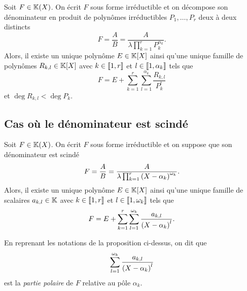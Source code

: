 \documentclass{magnolia}
\begin{document}
\begin{proposition}[nom={Décomposition en éléments simples}]
Soit $F\in\fracK$. On écrit $F$ sous forme irréductible et on
décompose son dénominateur en produit de polynômes irréductibles $P_1,\ldots,P_r$ deux
à deux distincts
\[F=\frac{A}{B}=\frac{A}{\lambda \prod_{k=1}^r P_k^{\alpha_k}}.\]
Alors, il existe un unique polynôme $E\in\polyK$ ainsi qu'une unique famille
de polynômes $R_{k,l}\in\polyK$ avec $k\in\left\llbracket 1,r\right\rrbracket$ et
$l\in\left\llbracket 1,\alpha_k\right\rrbracket$ tels que
\[F=E+\sum_{k=1}^r \sum_{l=1}^{\alpha_k} \frac{R_{k,l}}{P_k^l}\]
et $\deg R_{k,l}<\deg P_k$.
\end{proposition}

\subsection{Cas où le dénominateur est scindé}

\begin{proposition}
Soit $F\in\fracK$.  On écrit $F$ sous forme irréductible et on suppose
que son dénominateur est scindé
\[F=\frac{A}{B}=\frac{A}{\lambda \prod_{k=1}^r \left(X-\alpha_k\right)^{\omega_k}}.\]
Alors, il existe un unique polynôme $E\in\polyK$ ainsi qu'une unique famille
de scalaires $a_{k,l}\in\mathbb{K}$ avec $k\in\left\llbracket 1,r\right\rrbracket$ et $l\in\left\llbracket 1,\omega_k\right\rrbracket$
tels que
\[F=E+\sum_{k=1}^r \sum_{l=1}^{\omega_k} \frac{a_{k,l}}{\left(X-\alpha_k\right)^l}.\]
\end{proposition}

\begin{remarqueUnique}
\remarque En reprenant les notations de la proposition ci-dessus, on dit que
  \[\sum_{l=1}^{\omega_k} \frac{a_{k,l}}{\left(X-\alpha_k\right)^l}\]
  est la \emph{partie polaire} de $F$ relative au pôle $\alpha_k$.
\end{remarqueUnique}

\end{document}
